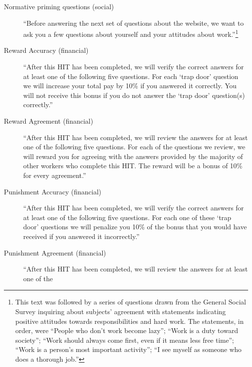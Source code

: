 \documentclass{chi2009}
\begin{document}
\begin{description}
\item[Normative priming questions (social)] ``Before answering the next
  set of questions about the website, we want to ask you a few
  questions about yourself and your attitudes about
  work.''\footnote{This text was followed by a series of questions drawn from the General Social Survey inquiring about subjects' agreement with statements indicating positive attitudes towards responsibilities and hard work. The statements, in order, were ``People who don't work become lazy''; ``Work is a duty toward society''; ``Work should always come first, even if it means less free time''; ``Work is a person's most important activity''; ``I see myself as someone who does a thorough job.''} %
\item[Reward Accuracy (financial)] ``After this HIT has been completed,
  we will verify the correct answers for at least one of the following
  five questions. For each `trap door' question we will increase your
  total pay by 10\% if you answered it correctly. You will not receive
  this bonus if you do not answer the `trap door' question(s)
  correctly.'' %
\item[Reward Agreement (financial)] ``After this HIT has been
  completed, we will review the answers for at least one of the
  following five questions. For each of the questions we review, we
  will reward you for agreeing with the answers provided by the
  majority of other workers who complete this HIT. The reward will be
  a bonus of 10\% for every agreement.'' %
\item[Punishment Accuracy (financial)] ``After this HIT has been
  completed, we will verify the correct answers for at least one of
  the following five questions. For each one of these `trap door'
  questions we will penalize you 10\% of the bonus that you would have
  received if you answered it incorrectly.'' %
\item[Punishment Agreement (financial)] ``After this HIT has been
  completed, we will review the answers for at least one of the

\end{description}
\end{document}
